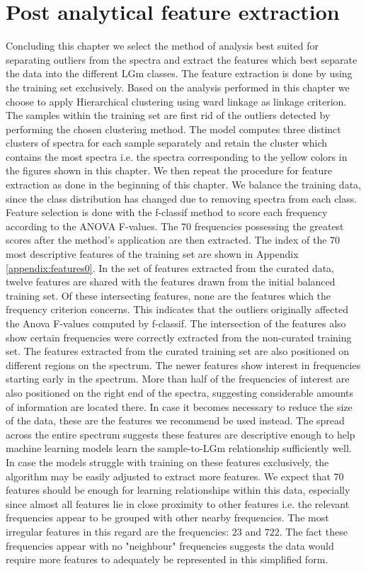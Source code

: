 \section{Post analytical feature extraction}
Concluding this chapter we select the method of analysis best suited for separating outliers from the spectra and extract the features which best separate the data into the different LGm classes. The feature extraction is done by using the training set exclusively. Based on the analysis performed in this chapter we choose to apply Hierarchical clustering using ward linkage as linkage criterion. The samples within the training set are first rid of the outliers detected by performing the chosen clustering method. The model computes three distinct clusters of spectra for each sample separately and retain the cluster which contains the most spectra i.e. the spectra corresponding to the yellow colors in the figures shown in this chapter. We then repeat the procedure for feature extraction as done in the beginning of this chapter. We balance the training data, since the class distribution has changed due to removing spectra from each class. Feature selection is done with the f-classif method to score each frequency according to the ANOVA F-values. The 70 frequencies possessing the greatest scores after the method's application are then extracted. The index of the 70 most descriptive features of the training set are shown in Appendix \ref{appendix:features0}. In the set of features extracted from the curated data, twelve features are shared with the features drawn from the initial balanced training set. Of these intersecting features, none are the features which the frequency criterion concerns. This indicates that the outliers originally affected the Anova F-values computed by f-classif. The intersection of the features also show certain frequencies were correctly extracted from the non-curated training set. The features extracted from the curated training set are also positioned on different regions on the spectrum. The newer features show interest in frequencies starting early in the spectrum. More than half of the frequencies of interest are also positioned on the right end of the spectra, suggesting considerable amounts of information are located there. In case it becomes necessary to reduce the size of the data, these are the features we recommend be used instead. The spread across the entire spectrum suggests these features are descriptive enough to help machine learning models learn the sample-to-LGm relationship sufficiently well. In case the models struggle with training on these features exclusively, the algorithm may be easily adjusted to extract more features. We expect that $70$ features should be enough for learning relationships within this data, especially since almost all features lie in close proximity to other features i.e. the relevant frequencies appear to be grouped with other nearby frequencies. The most irregular features in this regard are the frequencies: $23$ and $722$. The fact these frequencies appear with no "neighbour" frequencies suggests the data would require more features to adequately be represented in this simplified form. 